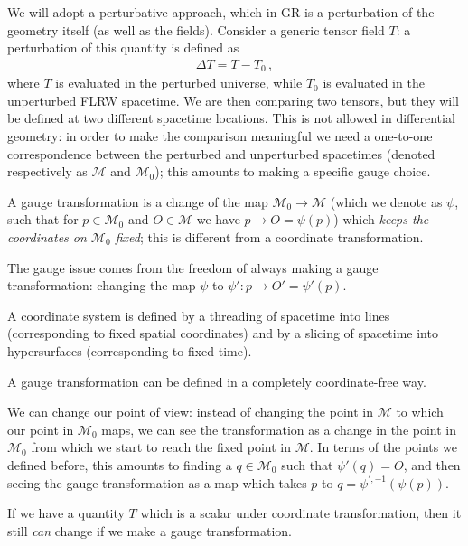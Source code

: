 \documentclass[main.tex]{subfiles}
\begin{document}
We will adopt a perturbative approach, which in GR is a perturbation of the geometry itself (as well as the fields). 
Consider a generic tensor field \(T\): a perturbation of this quantity is defined as 
%
\begin{align}
\Delta T = T - T_0 
\,,
\end{align}
%
where \(T\) is evaluated in the perturbed universe, while \(T_0 \) is evaluated in the unperturbed FLRW spacetime. 
We are then comparing two tensors, but they will be defined at two different spacetime locations. 
This is not allowed in differential geometry: in order to make the comparison meaningful we need a one-to-one correspondence between the perturbed and unperturbed spacetimes (denoted respectively as \(\mathcal{M}\) and \(\mathcal{M}_0\)); this amounts to making a specific gauge choice. 

A gauge transformation is a change of the map \(\mathcal{M}_0 \to \mathcal{M}\) (which we denote as \(\psi \), such that for \(p \in \mathcal{M}_0\) and \(O\in \mathcal{M}\) we have \(p \to O = \psi (p)\)) which \emph{keeps the coordinates on \(\mathcal{M}_0\) fixed}; this is different from a coordinate transformation.

The gauge issue comes from the freedom of always making a gauge transformation: changing the map \(\psi \) to \(\psi' \colon p \to O' = \psi '(p)\). 

A coordinate system is defined by a threading of spacetime into lines (corresponding to fixed spatial coordinates) and by a slicing of spacetime into hypersurfaces (corresponding to fixed time).

A gauge transformation can be defined in a completely coordinate-free way.

We can change our point of view: instead of changing the point in \(\mathcal{M}\) to which our point in \(\mathcal{M}_0\) maps, we can see the transformation as a change in the point in \(\mathcal{M}_0\) from which we start to reach the fixed point in \(\mathcal{M}\). 
In terms of the points we defined before, this amounts to finding a \(q \in \mathcal{M}_0\) such that \(\psi' (q) = O\), and then seeing the gauge transformation as a map which takes \(p\) to \(q = \psi^{\prime, -1} (\psi (p))\). 

If we have a quantity \(T\) which is a scalar under coordinate transformation, then it still \emph{can} change if we make a gauge transformation. 
\end{document}
